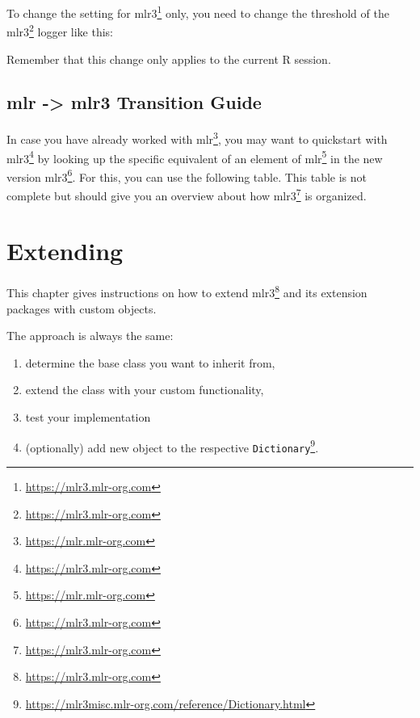 \documentclass[12pt,]{scrbook}
\newenvironment{Shaded}{}{}
\newcommand{\KeywordTok}[1]{\textcolor[rgb]{0.00,0.00,1.00}{#1}}
\newcommand{\NormalTok}[1]{#1}
\newcommand{\OperatorTok}[1]{#1}
\newcommand{\StringTok}[1]{\textcolor[rgb]{0.00,0.50,0.50}{#1}}
\providecommand{\tightlist}{%
  \setlength{\itemsep}{0pt}\setlength{\parskip}{0pt}}
\renewcommand{\href}[2]{#2\footnote{\url{#1}}}
\begin{document}
To change the setting for \href{https://mlr3.mlr-org.com}{mlr3} only, you need to change the threshold of the \href{https://mlr3.mlr-org.com}{mlr3} logger like this:

\begin{Shaded}
\end{Shaded}

Remember that this change only applies to the current R session.

\hypertarget{transition}{%
\section{mlr -\textgreater{} mlr3 Transition Guide}\label{transition}}

In case you have already worked with \href{https://mlr.mlr-org.com}{mlr}, you may want to quickstart with \href{https://mlr3.mlr-org.com}{mlr3} by looking up the specific equivalent of an element of \href{https://mlr.mlr-org.com}{mlr} in the new version \href{https://mlr3.mlr-org.com}{mlr3}.
For this, you can use the following table.
This table is not complete but should give you an overview about how \href{https://mlr3.mlr-org.com}{mlr3} is organized.

\hypertarget{extending}{%
\chapter{Extending}\label{extending}}

This chapter gives instructions on how to extend \href{https://mlr3.mlr-org.com}{mlr3} and its extension packages with custom objects.

The approach is always the same:

\begin{enumerate}
\def\labelenumi{\arabic{enumi}.}
\tightlist
\item
  determine the base class you want to inherit from,
\item
  extend the class with your custom functionality,
\item
  test your implementation
\item
  (optionally) add new object to the respective \href{https://mlr3misc.mlr-org.com/reference/Dictionary.html}{\texttt{Dictionary}}.
\end{enumerate}
\end{document}
